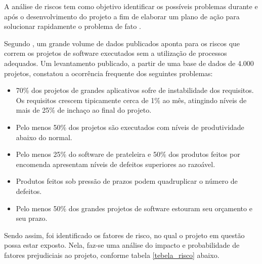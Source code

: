 A análise de riscos tem como objetivo identificar os possíveis problemas durante e após o desenvolvimento do projeto a fim de elaborar um plano de ação para solucionar rapidamente o problema de fato \cite{schmitzanalise}.

Segundo \cite{de2003engenharia}, um grande volume de dados publicados aponta para os riscos que correm os projetos de software executados sem a utilização de processos adequados. Um levantamento publicado, a partir de
uma base de dados de 4.000 projetos, constatou a ocorrência frequente dos seguintes
problemas: 

\begin{itemize}
	
	\item 70\% dos projetos de grandes aplicativos sofre de instabilidade dos requisitos. Os requisitos crescem tipicamente cerca de 1\% ao mês, atingindo níveis de mais de 25\% de inchaço ao final
	do projeto.
	
	\item Pelo menos 50\% dos projetos são executados com níveis de produtividade abaixo do normal.
	
	\item Pelo menos 25\% do software de prateleira e 50\% dos produtos feitos por encomenda apresentam níveis de defeitos superiores ao razoável. 
	
	\item Produtos feitos sob pressão de prazos podem quadruplicar o número de defeitos.
	
	\item Pelo menos 50\% dos grandes projetos de software estouram seu orçamento e seu prazo.
	
\end{itemize}

Sendo assim, foi identificado os fatores de risco, no qual o projeto em questão possa estar exposto. Nela, faz-se uma análise do impacto e probabilidade de fatores prejudiciais ao projeto, conforme tabela \ref{tebela_risco} abaixo.

